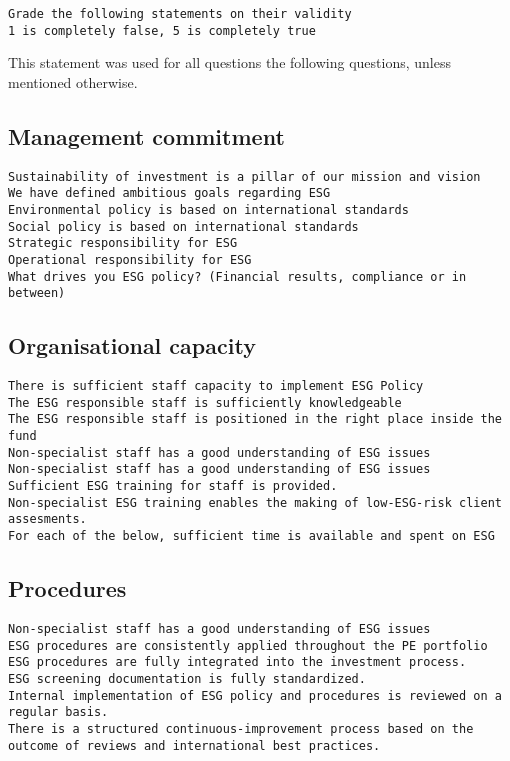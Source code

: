 \documentclass[twoside,12pt]{article}
\begin{document}
\begin{lstlisting}
Grade the following statements on their validity
1 is completely false, 5 is completely true
\end{lstlisting}
This statement was used for all questions the following questions, unless mentioned otherwise.

\subsection{Management commitment}
\begin{lstlisting}
Sustainability of investment is a pillar of our mission and vision
We have defined ambitious goals regarding ESG
Environmental policy is based on international standards
Social policy is based on international standards
Strategic responsibility for ESG
Operational responsibility for ESG
What drives you ESG policy? (Financial results, compliance or in between)
\end{lstlisting}

\subsection{Organisational capacity}
\begin{lstlisting}
There is sufficient staff capacity to implement ESG Policy
The ESG responsible staff is sufficiently knowledgeable
The ESG responsible staff is positioned in the right place inside the fund
Non-specialist staff has a good understanding of ESG issues
Non-specialist staff has a good understanding of ESG issues
Sufficient ESG training for staff is provided.
Non-specialist ESG training enables the making of low-ESG-risk client assesments.
For each of the below, sufficient time is available and spent on ESG
\end{lstlisting}

\subsection{Procedures}
\begin{lstlisting}
Non-specialist staff has a good understanding of ESG issues
ESG procedures are consistently applied throughout the PE portfolio
ESG procedures are fully integrated into the investment process.
ESG screening documentation is fully standardized.
Internal implementation of ESG policy and procedures is reviewed on a regular basis.
There is a structured continuous-improvement process based on the outcome of reviews and international best practices.
\end{lstlisting}
\end{document}
